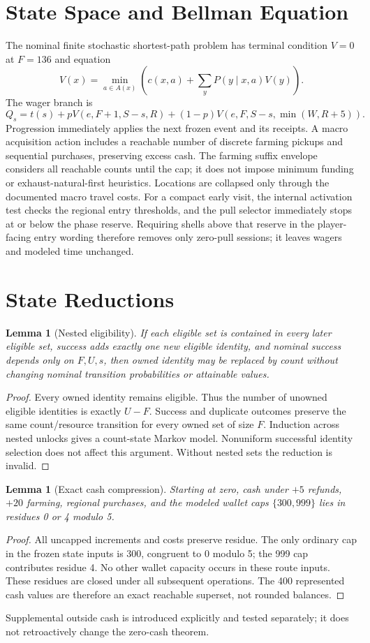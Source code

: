 \documentclass[11pt]{article}
\newtheorem{lemma}[theorem]{Lemma}
\theoremstyle{definition}\newtheorem{definition}[theorem]{Definition}
\begin{document}
\section{State Space and Bellman Equation}
The nominal finite stochastic shortest-path problem has terminal condition $V=0$ at $F=136$ and equation
\[
 V(x)=\min_{a\in A(x)}\left(c(x,a)+\sum_y P(y\mid x,a)V(y)\right).
\]
The wager branch is
\[
 Q_s=t(s)+pV(e,F+1,S-s,R)+(1-p)V(e,F,S-s,\min(W,R+5)).
\]
Progression immediately applies the next frozen event and its receipts. A macro acquisition action includes a reachable number of discrete farming pickups and sequential purchases, preserving excess cash. The farming suffix envelope considers all reachable counts until the cap; it does not impose minimum funding or exhaust-natural-first heuristics. Locations are collapsed only through the documented macro travel costs. For a compact early visit, the internal activation test checks the regional entry thresholds, and the pull selector immediately stops at or below the phase reserve. Requiring shells above that reserve in the player-facing entry wording therefore removes only zero-pull sessions; it leaves wagers and modeled time unchanged.
\section{State Reductions}
\begin{lemma}[Nested eligibility]
If each eligible set is contained in every later eligible set, success adds exactly one new eligible identity, and nominal success depends only on $F,U,s$, then owned identity may be replaced by count without changing nominal transition probabilities or attainable values.
\end{lemma}
\begin{proof}
Every owned identity remains eligible. Thus the number of unowned eligible identities is exactly $U-F$. Success and duplicate outcomes preserve the same count/resource transition for every owned set of size $F$. Induction across nested unlocks gives a count-state Markov model. Nonuniform successful identity selection does not affect this argument. Without nested sets the reduction is invalid.
\end{proof}
\begin{lemma}[Exact cash compression]
Starting at zero, cash under $+5$ refunds, $+20$ farming, regional purchases, and the modeled wallet caps $\{300,999\}$ lies in residues 0 or 4 modulo 5.
\end{lemma}
\begin{proof}
All uncapped increments and costs preserve residue. The only ordinary cap in the frozen state inputs is 300, congruent to 0 modulo 5; the 999 cap contributes residue 4. No other wallet capacity occurs in these route inputs. These residues are closed under all subsequent operations. The 400 represented cash values are therefore an exact reachable superset, not rounded balances.
\end{proof}
Supplemental outside cash is introduced explicitly and tested separately; it does not retroactively change the zero-cash theorem.
\end{document}

